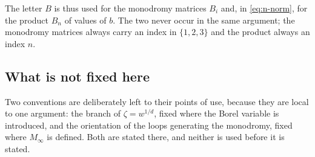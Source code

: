 The letter $B$ is thus used for the monodromy matrices $B_i$ and, in
\eqref{eq:n-norm}, for the product $B_n$ of values of $b$. The two never occur
in the same argument; the monodromy matrices always carry an index in
$\{1,2,3\}$ and the product always an index $n$.

\subsection{What is not fixed here}\label{ssec:notfixed}

Two conventions are deliberately left to their points of use, because they are
local to one argument: the branch of $\zeta=w^{1/d}$, fixed where the Borel
variable is introduced, and the orientation of the loops generating the
monodromy, fixed where $M_\infty$ is defined. Both are stated there, and
neither is used before it is stated.
